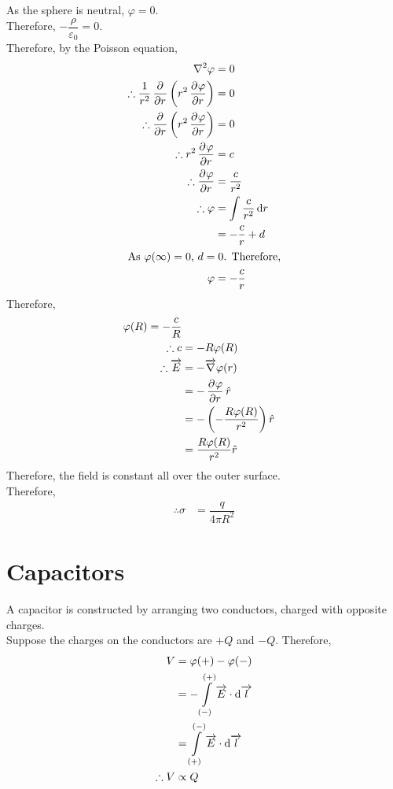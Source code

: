 \documentclass[fleqn, a4paper, 12pt, twoside]{article}
\theoremstyle{definition}
\theoremstyle{theorem}
\begin{document}
\begin{solution}
	As the sphere is neutral, $\varphi = 0$.\\
	Therefore, $-\dfrac{\rho}{\varepsilon_0} = 0$.\\
	Therefore, by the Poisson equation,
	\begin{align*}
		\nabla^2 \varphi &= 0\\
		\therefore \dfrac{1}{r^2} \dpd{}{r} \left( r^2 \dpd{\varphi}{r} \right) &= 0\\
		\therefore \dpd{}{r} \left( r^2 \dpd{\varphi}{r} \right) &= 0\\
		\therefore r^2 \dpd{\varphi}{r} &= c\\
		\therefore \dpd{\varphi}{r} &= \dfrac{c}{r^2}\\
		\therefore \varphi &= \int \dfrac{c}{r^2} \dif r\\
		&= -\dfrac{c}{r} + d\\
		\intertext{As $\varphi(\infty) = 0$, $d = 0$. Therefore,}
		\varphi &= -\dfrac{c}{r}
	\end{align*}
	Therefore,
	\begin{align*}
		\varphi(R) = -\dfrac{c}{R}\\
		\therefore c &= -R \varphi(R)\\
		\therefore \overrightarrow{E} &= -\overrightarrow{\nabla} \varphi(r)\\
		&= -\dpd{\varphi}{r} \hat{r}\\
		&= -\left( -\dfrac{R \varphi(R)}{r^2} \right) \hat{r}\\
		&= \dfrac{R \varphi(R)}{r^2} \hat{r}
	\end{align*}
	Therefore, the field is constant all over the outer surface.\\
	Therefore, 
	\begin{align*}
		\therefore \sigma &= \dfrac{q}{4 \pi R^2}
	\end{align*}
\end{solution}

\section{Capacitors}

A capacitor is constructed by arranging two conductors, charged with opposite charges.\\
Suppose the charges on the conductors are $+Q$ and $-Q$.
Therefore,
\begin{align*}
	V &= \varphi(+) - \varphi(-)\\
	&= -\int\limits_{(-)}^{(+)} \overrightarrow{E} \cdot \dif \overrightarrow{l}\\
	&= \int\limits_{(+)}^{(-)} \overrightarrow{E} \cdot \dif \overrightarrow{l}\\
	\therefore V &\propto Q
\end{align*}
\end{document}
